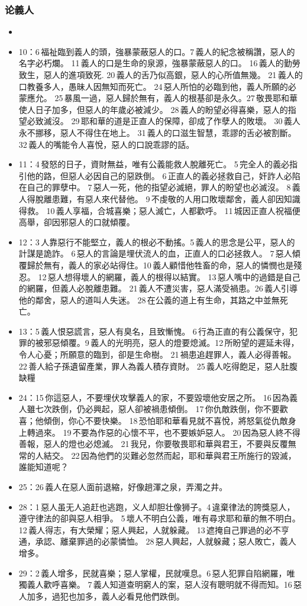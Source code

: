 \subsubsection{论義人}
\begin{itemize}
\itemsep-.45em 
\item 
\item 10：6 福祉臨到義人的頭，強暴蒙蔽惡人的口。7 義人的紀念被稱讚，惡人的名字必朽爛。 11 義人的口是生命的泉源，強暴蒙蔽惡人的口。 16 義人的勤勞致生，惡人的進項致死. 20 義人的舌乃似高銀，惡人的心所值無幾。 21 義人的口教養多人，愚昧人因無知而死亡。 24 惡人所怕的必臨到他，義人所願的必蒙應允。 25 暴風一過，惡人歸於無有，義人的根基卻是永久。27 敬畏耶和華使人日子加多，但惡人的年歲必被減少。 28 義人的盼望必得喜樂，惡人的指望必致滅沒。 29 耶和華的道是正直人的保障，卻成了作孽人的敗壞。 30 義人永不挪移，惡人不得住在地上。 31 義人的口滋生智慧，乖謬的舌必被割斷。 32 義人的嘴能令人喜悅，惡人的口說乖謬的話。
\item 11：4 發怒的日子，資財無益，唯有公義能救人脫離死亡。 5 完全人的義必指引他的路，但惡人必因自己的惡跌倒。 6 正直人的義必拯救自己，奸詐人必陷在自己的罪孽中。 7 惡人一死，他的指望必滅絕，罪人的盼望也必滅沒。 8 義人得脫離患難，有惡人來代替他。 9 不虔敬的人用口敗壞鄰舍，義人卻因知識得救。 10 義人享福，合城喜樂；惡人滅亡，人都歡呼。 11 城因正直人祝福便高舉，卻因邪惡人的口就傾覆。
\item 12：3 人靠惡行不能堅立，義人的根必不動搖。5 義人的思念是公平，惡人的計謀是詭詐。 6 惡人的言論是埋伏流人的血，正直人的口必拯救人。 7 惡人傾覆歸於無有，義人的家必站得住。10 義人顧惜他牲畜的命，惡人的憐憫也是殘忍。 12 惡人想得壞人的網羅，義人的根得以結實。 13 惡人嘴中的過錯是自己的網羅，但義人必脫離患難。 21 義人不遭災害，惡人滿受禍患。26 義人引導他的鄰舍，惡人的道叫人失迷。 28 在公義的道上有生命，其路之中並無死亡。
\item 13：5 義人恨惡謊言，惡人有臭名，且致慚愧。 6 行為正直的有公義保守，犯罪的被邪惡傾覆。9 義人的光明亮，惡人的燈要熄滅。12 所盼望的遲延未得，令人心憂；所願意的臨到，卻是生命樹。 21 禍患追趕罪人，義人必得善報。 22 善人給子孫遺留產業，罪人為義人積存資財。 25 義人吃得飽足，惡人肚腹缺糧
\item 24：15 你這惡人，不要埋伏攻擊義人的家，不要毀壞他安居之所。 16 因為義人雖七次跌倒，仍必興起，惡人卻被禍患傾倒。 17 你仇敵跌倒，你不要歡喜；他傾倒，你心不要快樂。 18 恐怕耶和華看見就不喜悅，將怒氣從仇敵身上轉過來。 19 不要為作惡的心懷不平，也不要嫉妒惡人。 20 因為惡人終不得善報，惡人的燈也必熄滅。 21 我兒，你要敬畏耶和華與君王，不要與反覆無常的人結交。 22 因為他們的災難必忽然而起，耶和華與君王所施行的毀滅，誰能知道呢？
\item 25：26 義人在惡人面前退縮，好像趟渾之泉，弄濁之井。 
\item 28：1 惡人虽无人追赶也逃跑，义人却胆壮像狮子。4 違棄律法的誇獎惡人，遵守律法的卻與惡人相爭。 5 壞人不明白公義，唯有尋求耶和華的無不明白。 12 義人得志，有大榮耀；惡人興起，人就躲藏。 13 遮掩自己罪過的必不亨通，承認、離棄罪過的必蒙憐恤。 28 惡人興起，人就躲藏；惡人敗亡，義人增多。
\item 29：2 義人增多，民就喜樂；惡人掌權，民就嘆息。6 惡人犯罪自陷網羅，唯獨義人歡呼喜樂。 7 義人知道查明窮人的案，惡人沒有聰明就不得而知。16 惡人加多，過犯也加多，義人必看見他們跌倒。
\end{itemize}
